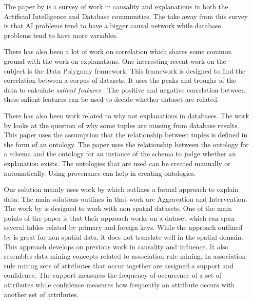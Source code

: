 The paper by \cite{meliou2014causality} is a survey of work in causality and explanations in both the Artificial Intelligence and Database communities. The take away from this survey is that AI problems tend to have a bigger causal network while database problems tend to have more variables.

There has also been a lot of work on correlation which shares some common ground with the work on explanations. One interesting recent work on the subject is the Data Polygamy framework\citep{chirigati2016data}. This framework is designed to find the correlation between a corpus of datasets. It uses the peaks and troughs of the data to calculate \textit{salient features} \citep{dunn1986applied}. The positive and negative correlation between these salient features can be used to decide whether dataset are related\citep{su2014supporting}.

There has also been work related to why not explanations in databases. The work by \citep{ten2015high} looks at the question of why some tuples are missing from database results. This paper uses the assumption that the relationship between tuples is defined in the form of an ontology. The paper uses the relationship between the ontology for a schema and the ontology for an instance of the schema to judge whether an explanation exists. The ontologies that are used can be created manually or automatically. Using provenance \citep{cheney2009provenance} can help in creating ontologies.

Our solution mainly uses work by \cite{roy2014formal} which outlines a formal approach to explain data. The main solutions outlines in that work are Aggravation and Intervention. The work by \cite{roy2014formal} is designed to work with non spatial datasets. One of the main points of the paper is that their approach works on a dataset which can span several tables related by primary and foreign keys. While the approach outlined by \cite{roy2014formal} is great for non spatial data, it does not translate well in the spatial domain. This approach develops on previous work in causality and influence. It also resembles data mining concepts related to association rule mining\citep{agarwal1994fast,tan2006introduction}. In association rule mining sets of attributes that occur together are assigned a support and confidence. The support measures the frequency of occurrence of a set of attributes while confidence measures how frequently an attribute occurs with another set of attributes.

